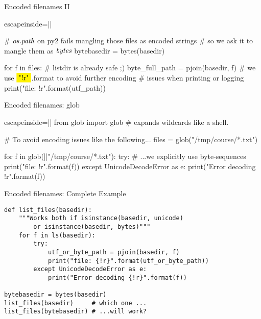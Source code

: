 \begin{frame}[fragile]{Encoded filenames II}
\begin{pythoncode*}{escapeinside=||}

# $\emph{os.path}$ on py2 fails mangling those files as encoded strings
#  so we ask it to mangle them as $\emph{bytes}$
bytebasedir = bytes(basedir)

for f in files: # listdir is already safe ;)
    byte_full_path = pjoin(basedir, f)
    # we use $\pyver{"{!r}"}$.format to avoid further encoding
    #     issues when printing or logging
    print("file: {!r}".format(utf_path))
    
\end{pythoncode*}
\end{frame}

\begin{frame}[fragile]{Encoded filenames: glob}
\begin{pythoncode*}{escapeinside=||}
from glob import glob # expands wildcards like a shell. 

# To avoid encoding issues like the following...
files = glob("/tmp/course/*.txt") 

for f in glob(||"/tmp/course/*.txt"):
    try: # ...we explicitly use byte-sequences
        print("file: {!r}".format(f))
    except UnicodeDecodeError as e:
        print("Error decoding {!r}".format(f))

\end{pythoncode*}
\end{frame}


\begin{frame}[fragile]{Encoded filenames: Complete Example}
\begin{verbatim}
def list_files(basedir):
    """Works both if isinstance(basedir, unicode)
        or isinstance(basedir, bytes)"""
    for f in ls(basedir):
        try:
            utf_or_byte_path = pjoin(basedir, f)
            print("file: {!r}".format(utf_or_byte_path))
        except UnicodeDecodeError as e:
            print("Error decoding {!r}".format(f))

bytebasedir = bytes(basedir)
list_files(basedir)     # which one ...
list_files(bytebasedir) # ...will work?
    
\end{verbatim}
\end{frame}
